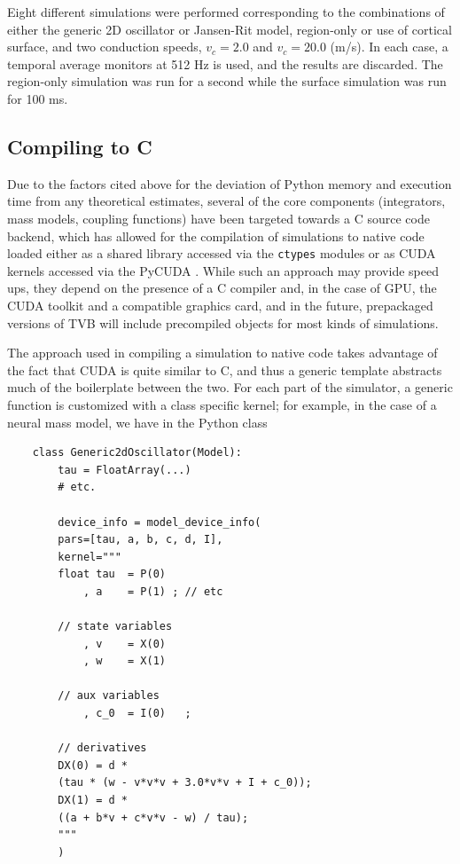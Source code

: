 	Eight different simulations were performed corresponding to the combinations of
	either the generic 2D oscillator or Jansen-Rit model, region-only
	or use of cortical surface, and two conduction speeds, $v_c = 2.0$ and
	$v_c = 20.0$ (m/s). In each case, a temporal average monitors at 512 Hz
	is used, and the results are discarded. The region-only simulation was
	run for a second while the surface simulation was run for 100 ms. 

\subsection{Compiling to C}

	Due to the factors cited above for the deviation of Python memory
	and execution time from any theoretical estimates, 
	several of the core components (integrators, mass models, coupling
	functions) have been targeted towards a C source code backend, which has
	allowed for the compilation of simulations to native code loaded 
	either as a shared library accessed via the \texttt{ctypes} modules
	or as CUDA kernels accessed via the PyCUDA \cite{PyCUDA}.
	While such an approach may provide speed ups, they depend on the
	presence of a C compiler and, in the case of GPU, the CUDA toolkit and
	a compatible graphics card, and in the future, prepackaged versions of TVB
	will include precompiled objects for most kinds of simulations. 

	The approach used in compiling a simulation to native code takes advantage
	of the fact that CUDA is quite similar to C, and thus a generic template
	abstracts much of the boilerplate between the two. For each part of the 
	simulator, a generic function is customized with a class specific kernel;
	for example, in the case of a neural mass model, we have in the Python class

	\begin{lstlisting}
	class Generic2dOscillator(Model):
	    tau = FloatArray(...)
	    # etc.

	    device_info = model_device_info(
		pars=[tau, a, b, c, d, I],
		kernel="""
		float tau  = P(0)
		    , a    = P(1) ; // etc

		// state variables
		    , v    = X(0)
		    , w    = X(1)

		// aux variables
		    , c_0  = I(0)   ;

		// derivatives
		DX(0) = d * 
		(tau * (w - v*v*v + 3.0*v*v + I + c_0));
		DX(1) = d * 
		((a + b*v + c*v*v - w) / tau);
		"""
	    )
	\end{lstlisting}

